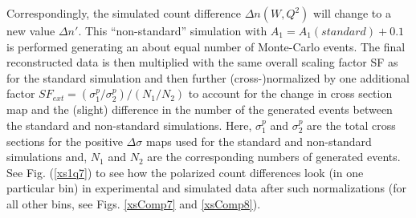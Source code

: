Correspondingly, the simulated count difference $\Delta n (W,Q^2)$ will change to a new value $\Delta n'$. This ``non-standard'' simulation with $A_1 = A_1(standard) + 0.1$ is performed generating an about equal number of Monte-Carlo events. The final reconstructed data is then multiplied with the same overall scaling factor SF as for the standard simulation and then further (cross-)normalized by one additional factor $SF_{ext}=(\sigma^p_1/\sigma^p_2)/(N_1/N_2)$ to account for the change in cross section map and the (slight) difference in the number of the generated events between the standard and non-standard simulations. Here, $\sigma^p_1$ and $\sigma^p_2$ are the total cross sections for the positive $\Delta \sigma$ maps used for the standard and non-standard simulations and, $N_1$ and $N_2$ are the corresponding numbers of generated events. %
See Fig. (\ref{xs1q7}) to see how the polarized count differences look (in one particular \qsqs bin) in experimental and simulated data after such normalizations (for all other \qsqs bins, see Figs. \ref{xsComp7} and \ref{xsComp8}). %


